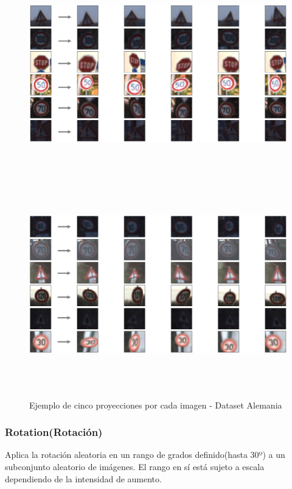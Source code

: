 			\begin{figure}[H]
				\begin{center}
				\includegraphics[width=1\textwidth,height=9cm]{images/desarrollo/Augment/projection_transform2}
				\includegraphics[width=1\textwidth,height=9cm]{images/desarrollo/Augment/projection_transform}
				\end{center}
				\begin{center}
				\vspace{1em}
				\caption{\small{Ejemplo de cinco proyecciones por cada imagen - Dataset Alemania}}	
				{\small{\fontsize{10}{16.8}\selectfont {Fuente: Elaboración propia}}}
				\end{center}
				\vspace{-1.5em}
			\end{figure}
		\newpage
		\subsubsection{Rotation(Rotación)}
			\vspace{-1.5em}
			Aplica la rotación aleatoria en un rango de grados definido(hasta 30º) a un subconjunto aleatorio de imágenes.
	        El rango en sí está sujeto a escala dependiendo de la intensidad de aumento.

